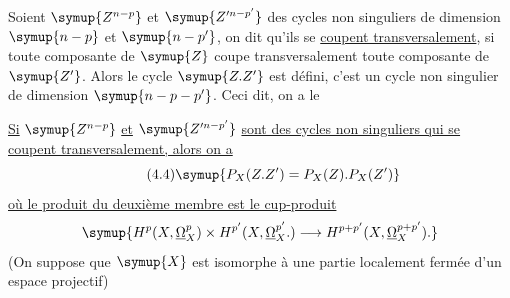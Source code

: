 Soient $\symup{Z^{n-p}}$ et $\symup{Z'^{n-p'}}$ des cycles non singuliers de dimension $\symup{n-p}$ et
$\symup{n-p'}$, on dit qu'ils se \uline{coupent transversalement}, si toute composante
de $\symup{Z}$ coupe transversalement toute composante de $\symup{Z'}$. Alors le cycle $\symup{Z.Z'}$ est
défini, c'est un cycle non singulier de dimension $\symup{n-p-p'}$. Ceci dit, on a le

 \uline{Si} $\symup{Z^{n-p}}$ \uline{et} $\symup{Z'^{n-p'}}$ \uline{sont des cycles non singuliers
qui se coupent transversalement, alors on a}
\begin{equation}\tag{4.4}
  \symup{P_X(Z.Z')=P_X(Z).P_X(Z')}
\end{equation}
\uline{où le produit du deuxième membre est le cup-produit}
\[
  \symup{H^{p}(X,\underline{\Omega}_X^{p})\times H^{p'}(X,\underline{\Omega}_X^{p'}.)
  \longrightarrow H^{p+p'}(X,\underline{\Omega}_X^{p+p'}).}
\]
(On suppose que $\symup{X}$ est isomorphe à une partie localement fermée d'un espace
projectif)

